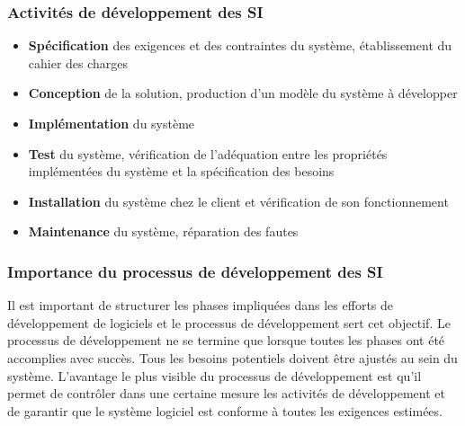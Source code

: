\subsubsection{Activités de développement des SI}
\begin{itemize}
    \item \textbf{Spécification} des exigences et des contraintes du système, établissement du cahier des charges
    \item \textbf{Conception} de la solution, production d'un modèle du système à développer
    \item \textbf{Implémentation} du système
    \item \textbf{Test} du système, vérification de l'adéquation entre les propriétés implémentées du système et la spécification des besoins
    \item \textbf{Installation} du système chez le client et vérification de son fonctionnement
    \item \textbf{Maintenance} du système, réparation des fautes
\end{itemize}

\subsubsection{Importance du processus de développement des SI}
Il est important de structurer les phases impliquées dans les efforts de développement de logiciels et le processus de développement sert cet objectif. Le processus de développement ne se termine que lorsque toutes les phases ont été accomplies avec succès. Tous les besoins potentiels doivent être ajustés au sein du système. L'avantage le plus visible du processus de développement est qu'il permet de contrôler dans une certaine mesure les activités de développement et de garantir que le système logiciel est conforme à toutes les exigences estimées. 


